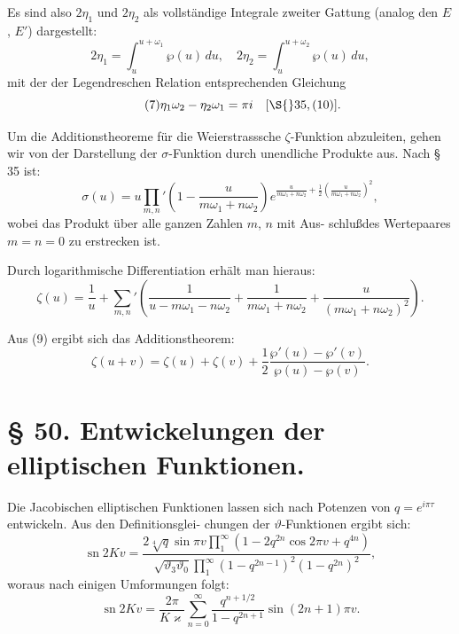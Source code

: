\documentclass[12pt,a4paper]{article}
\theoremstyle{definition}
\begin{document}
Es sind also $2\eta_1$ und $2\eta_2$ als vollst\"{a}ndige Integrale
zweiter Gattung (analog den $E$, $E'$) dargestellt:
\begin{equation}\tag{6}
2\eta_1 = \int_u^{u+\omega_1} \wp(u) \, du, \quad
2\eta_2 = \int_u^{u+\omega_2} \wp(u) \, du,
\end{equation}
mit der der Legendreschen Relation entsprechenden Gleichung
\begin{equation}\tag{7}
\eta_1\omega_2 - \eta_2\omega_1 = \pi i \quad [\S{} 35, (10)].
\end{equation}

Um die Additionstheoreme f\"{u}r die Weierstrasssche
$\zeta$-Funktion abzuleiten, gehen wir von der Darstellung der
$\sigma$-Funktion durch unendliche Produkte aus. Nach \S{} 35 ist:
\begin{equation}\tag{8}
\sigma(u) = u \prod_{m,n}' \left(1 - \frac{u}{m\omega_1 + n\omega_2}\right) e^{\frac{u}{m\omega_1 + n\omega_2} + \frac{1}{2}\left(\frac{u}{m\omega_1 + n\omega_2}\right)^2},
\end{equation}
wobei das Produkt \"{u}ber alle ganzen Zahlen $m$, $n$ mit Aus-
schlu\ss des Wertepaares $m = n = 0$ zu erstrecken ist.

Durch logarithmische Differentiation erh\"{a}lt man hieraus:
\begin{equation}\tag{9}
\zeta(u) = \frac{1}{u} + \sum_{m,n}' \left(\frac{1}{u - m\omega_1 - n\omega_2} + \frac{1}{m\omega_1 + n\omega_2} + \frac{u}{(m\omega_1 + n\omega_2)^2}\right).
\end{equation}

Aus (9) ergibt sich das Additionstheorem:
\begin{equation}\tag{10}
\zeta(u + v) = \zeta(u) + \zeta(v) + \frac{1}{2}\frac{\wp'(u) - \wp'(v)}{\wp(u) - \wp(v)}.
\end{equation}

\section*{\S{} 50. Entwickelungen der elliptischen Funktionen.}

Die Jacobischen elliptischen Funktionen lassen sich nach
Potenzen von $q = e^{i\pi\tau}$ entwickeln. Aus den Definitionsglei-
chungen der $\vartheta$-Funktionen ergibt sich:
\begin{equation}\tag{1}
\operatorname{sn} 2Kv = \frac{2\sqrt[4]{q}\sin\pi v \prod_1^\infty (1 - 2q^{2n}\cos 2\pi v + q^{4n})}{\sqrt{\vartheta_3\vartheta_0} \prod_1^\infty (1 - q^{2n-1})^2(1 - q^{2n})^2},
\end{equation}
woraus nach einigen Umformungen folgt:
\begin{equation}\tag{2}
\operatorname{sn} 2Kv = \frac{2\pi}{K\varkappa} \sum_{n=0}^\infty \frac{q^{n+1/2}}{1 - q^{2n+1}} \sin(2n+1)\pi v.
\end{equation}
\end{document}
